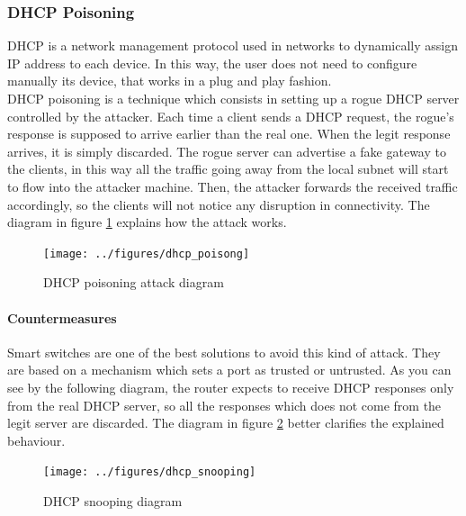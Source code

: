 \documentclass[final]{article}
\begin{document}
\subsubsection{DHCP Poisoning}
\ac{DHCP} is a network management protocol used in networks to dynamically assign IP address to each device.
In this way, the user does not need to configure manually its device, that works in a plug and play fashion.\\
\ac{DHCP} poisoning is a technique which consists in setting up a rogue \ac{DHCP}  server controlled by the attacker.
Each time a client sends a \ac{DHCP} request, the rogue's response is supposed to arrive earlier than the real one.
When the legit response arrives, it is simply discarded.
The rogue server can advertise a fake gateway to the clients, in this way all the traffic going away from the local subnet will start to flow into the attacker machine.
Then, the attacker forwards the received traffic accordingly, so the clients will not notice any disruption in connectivity.
The diagram in figure \ref{dhcp_poisoning} explains how the attack works.
\begin{figure}
\center
\texttt{[image: ../figures/dhcp\_poisong]}
\caption{DHCP poisoning attack diagram}
\label{dhcp_poisoning}
\end{figure}
\paragraph{Countermeasures}
Smart switches are one of the best solutions to avoid this kind of attack.
They are based on a mechanism which sets a port as trusted or untrusted.
As you can see by the following diagram, the router expects to receive DHCP responses only from the real DHCP server,
so all the responses which does not come from the legit server are discarded.
The diagram in figure \ref{dhcp_snooping} better clarifies the explained behaviour.

\begin{figure}
\center
\texttt{[image: ../figures/dhcp\_snooping]}
\caption{DHCP snooping diagram}
\label{dhcp_snooping}
\end{figure}
\newpage
\end{document}
